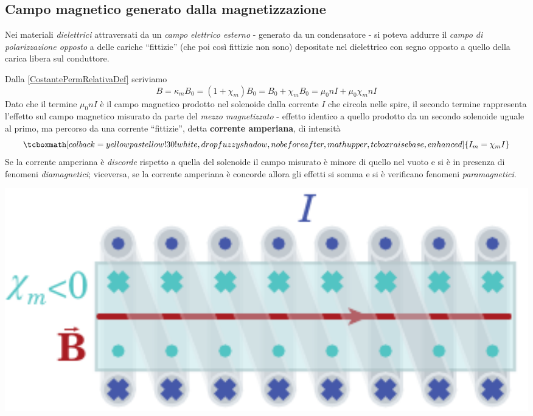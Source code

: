\subsection{Campo magnetico generato dalla magnetizzazione}
\begin{remember}
	Nei materiali \textit{dielettrici} attraversati da un \textit{campo elettrico esterno} - generato da un condensatore - si poteva addurre il \textit{campo di polarizzazione opposto} a delle cariche ``fittizie'' (che poi così fittizie non sono) depositate nel dielettrico con segno opposto a quello della carica libera sul conduttore.
\end{remember}
\noindent Dalla \eqref{CostantePermRelativaDef} scriviamo
\begin{equation*}
	B=\kappa_m B_0=\left(1+\chi_m\right)B_0=B_0+\chi_mB_0=\mu_0 n I + \mu_0 \chi_m n I
\end{equation*}
Dato che il termine $\mu_0 n I$ è il campo magnetico prodotto nel solenoide dalla corrente $I$ che circola nelle spire, il secondo termine rappresenta l'effetto sul campo magnetico misurato da parte del \textit{mezzo magnetizzato} - effetto identico a quello prodotto da un secondo solenoide uguale al primo, ma percorso da una corrente ``fittizie'', detta \textbf{corrente amperiana}, di intensità
\begin{equation}
	\tcboxmath[colback=yellowpastellow!30!white,drop fuzzy shadow, nobeforeafter, math upper, tcbox raise base, enhanced]{I_m=\chi_m I}
\end{equation}
Se la corrente amperiana è \textit{discorde} rispetto a quella del solenoide il campo misurato è minore di quello nel vuoto e si è in presenza di  fenomeni \textit{diamagnetici}; viceversa, se la corrente amperiana è concorde allora gli effetti si somma e si è verificano fenomeni \textit{paramagnetici}.\\
\begin{minipage}{0.49\textwidth}
	\begin{center}
		\includegraphics[width=1\textwidth]{images/chp12/chp12solenoideriempito2a.pdf}
	\end{center}
\end{minipage}
